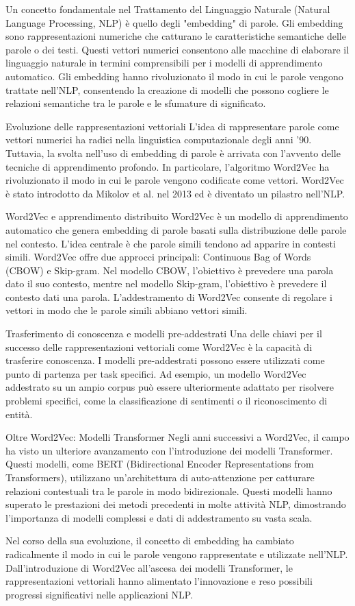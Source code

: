 Un concetto fondamentale nel Trattamento del Linguaggio Naturale (Natural Language Processing, NLP) è quello degli "embedding" di parole. Gli embedding sono rappresentazioni numeriche che catturano le caratteristiche semantiche delle parole o dei testi. Questi vettori numerici consentono alle macchine di elaborare il linguaggio naturale in termini comprensibili per i modelli di apprendimento automatico. Gli embedding hanno rivoluzionato il modo in cui le parole vengono trattate nell'NLP, consentendo la creazione di modelli che possono cogliere le relazioni semantiche tra le parole e le sfumature di significato.

Evoluzione delle rappresentazioni vettoriali
L'idea di rappresentare parole come vettori numerici ha radici nella linguistica computazionale degli anni '90. Tuttavia, la svolta nell'uso di embedding di parole è arrivata con l'avvento delle tecniche di apprendimento profondo. In particolare, l'algoritmo Word2Vec ha rivoluzionato il modo in cui le parole vengono codificate come vettori. Word2Vec è stato introdotto da Mikolov et al. nel 2013 ed è diventato un pilastro nell'NLP.

Word2Vec e apprendimento distribuito
Word2Vec è un modello di apprendimento automatico che genera embedding di parole basati sulla distribuzione delle parole nel contesto. L'idea centrale è che parole simili tendono ad apparire in contesti simili. Word2Vec offre due approcci principali: Continuous Bag of Words (CBOW) e Skip-gram. Nel modello CBOW, l'obiettivo è prevedere una parola dato il suo contesto, mentre nel modello Skip-gram, l'obiettivo è prevedere il contesto dati una parola. L'addestramento di Word2Vec consente di regolare i vettori in modo che le parole simili abbiano vettori simili.

Trasferimento di conoscenza e modelli pre-addestrati
Una delle chiavi per il successo delle rappresentazioni vettoriali come Word2Vec è la capacità di trasferire conoscenza. I modelli pre-addestrati possono essere utilizzati come punto di partenza per task specifici. Ad esempio, un modello Word2Vec addestrato su un ampio corpus può essere ulteriormente adattato per risolvere problemi specifici, come la classificazione di sentimenti o il riconoscimento di entità.

Oltre Word2Vec: Modelli Transformer
Negli anni successivi a Word2Vec, il campo ha visto un ulteriore avanzamento con l'introduzione dei modelli Transformer. Questi modelli, come BERT (Bidirectional Encoder Representations from Transformers), utilizzano un'architettura di auto-attenzione per catturare relazioni contestuali tra le parole in modo bidirezionale. Questi modelli hanno superato le prestazioni dei metodi precedenti in molte attività NLP, dimostrando l'importanza di modelli complessi e dati di addestramento su vasta scala.

Nel corso della sua evoluzione, il concetto di embedding ha cambiato radicalmente il modo in cui le parole vengono rappresentate e utilizzate nell'NLP. Dall'introduzione di Word2Vec all'ascesa dei modelli Transformer, le rappresentazioni vettoriali hanno alimentato l'innovazione e reso possibili progressi significativi nelle applicazioni NLP.